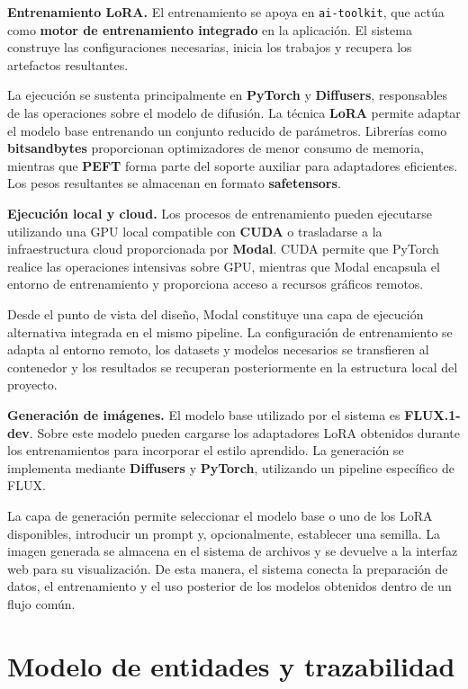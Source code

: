 \documentclass[a4paper,11pt,titlepage]{scrbook}
\begin{document}
\textbf{Entrenamiento LoRA.}
El entrenamiento se apoya en \texttt{ai-toolkit}, que actúa como \textbf{motor de entrenamiento integrado} en la aplicación. El sistema construye las configuraciones necesarias, inicia los trabajos y recupera los artefactos resultantes.

La ejecución se sustenta principalmente en \textbf{PyTorch} y \textbf{Diffusers}, responsables de las operaciones sobre el modelo de difusión. La técnica \textbf{LoRA} permite adaptar el modelo base entrenando un conjunto reducido de parámetros. Librerías como \textbf{bitsandbytes} proporcionan optimizadores de menor consumo de memoria, mientras que \textbf{PEFT} forma parte del soporte auxiliar para adaptadores eficientes. Los pesos resultantes se almacenan en formato \textbf{safetensors}.

\medskip

\textbf{Ejecución local y cloud.}
Los procesos de entrenamiento pueden ejecutarse utilizando una GPU local compatible con \textbf{CUDA} o trasladarse a la infraestructura cloud proporcionada por \textbf{Modal}. CUDA permite que PyTorch realice las operaciones intensivas sobre GPU, mientras que Modal encapsula el entorno de entrenamiento y proporciona acceso a recursos gráficos remotos.

Desde el punto de vista del diseño, Modal constituye una capa de ejecución alternativa integrada en el mismo pipeline. La configuración de entrenamiento se adapta al entorno remoto, los datasets y modelos necesarios se transfieren al contenedor y los resultados se recuperan posteriormente en la estructura local del proyecto.

\medskip

\textbf{Generación de imágenes.}
El modelo base utilizado por el sistema es \textbf{FLUX.1-dev}. Sobre este modelo pueden cargarse los adaptadores LoRA obtenidos durante los entrenamientos para incorporar el estilo aprendido. La generación se implementa mediante \textbf{Diffusers} y \textbf{PyTorch}, utilizando un pipeline específico de FLUX.

La capa de generación permite seleccionar el modelo base o uno de los LoRA disponibles, introducir un prompt y, opcionalmente, establecer una semilla. La imagen generada se almacena en el sistema de archivos y se devuelve a la interfaz web para su visualización. De esta manera, el sistema conecta la preparación de datos, el entrenamiento y el uso posterior de los modelos obtenidos dentro de un flujo común.

\section{Modelo de entidades y trazabilidad}
\end{document}
